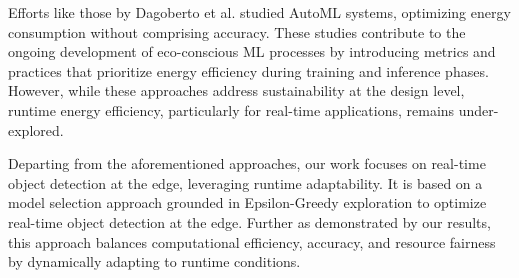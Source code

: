 Efforts like those by Dagoberto et al. \cite{b12} studied AutoML systems, optimizing energy consumption without comprising accuracy. These studies contribute to the ongoing development of eco-conscious ML processes by introducing metrics and practices that prioritize energy efficiency during training and inference phases. However, while these approaches address sustainability at the design level, runtime energy efficiency, particularly for real-time applications, remains under-explored.

Departing from the aforementioned approaches, our work focuses on real-time object detection at the edge, leveraging runtime adaptability. It is based on a model selection approach grounded in Epsilon-Greedy exploration to optimize real-time object detection at the edge. Further as demonstrated by our results, this approach balances computational efficiency, accuracy, and resource fairness by dynamically adapting to runtime conditions. 